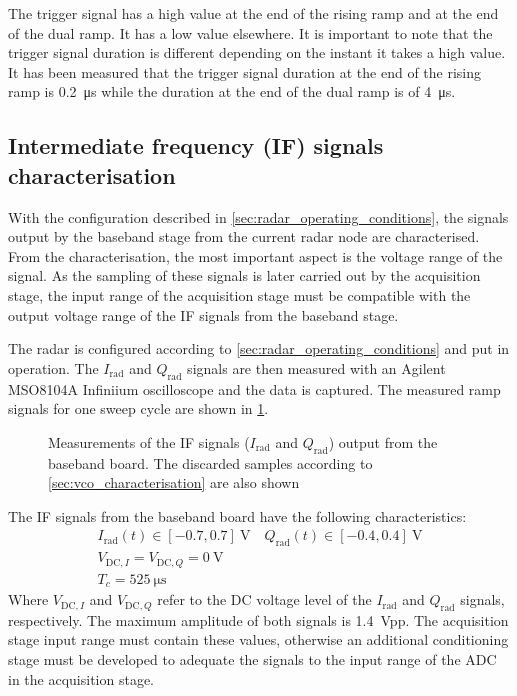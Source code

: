 The trigger signal has a high value at the end of the rising ramp and at the end of the dual ramp. It has a low value elsewhere. It is important to note that the trigger signal duration is different depending on the instant it takes a high value. It has been measured that the trigger signal duration at the end of the rising ramp is \SI{0.2}{\micro\second} while the duration at the end of the dual ramp is of \SI{4}{\micro\second}.

\subsection{Intermediate frequency (IF) signals characterisation} \label{sec:if_signals_characterisation}

With the configuration described in \cref{sec:radar_operating_conditions}, the signals output by the baseband stage from the current radar node are characterised. From the characterisation, the most important aspect is the voltage range of the signal. As the sampling of these signals is later carried out by the acquisition stage, the input range of the acquisition stage must be compatible with the output voltage range of the IF signals from the baseband stage.

The radar is configured according to \cref{sec:radar_operating_conditions} and put in operation. The $I_\mathrm{rad}$ and $Q_\mathrm{rad}$ signals are then measured with an Agilent MSO8104A Infiniium oscilloscope and the data is captured. The measured ramp signals for one sweep cycle are shown in \cref{fig:if_raw}.

\begin{figure}[htb]
	\centering
	\caption{Measurements of the IF signals ($I_\mathrm{rad}$ and $Q_\mathrm{rad}$) output from the baseband board. The discarded samples according to \cref{sec:vco_characterisation} are also shown \label{fig:if_raw}}
\end{figure}

The IF signals from the baseband board have the following characteristics:
\begin{gather} \label{eqn:iq_volts}
	I_\mathrm{rad}(t) \in [-0.7, 0.7]\ \si{\volt}\quad
	Q_\mathrm{rad}(t) \in [-0.4, 0.4]\ \si{\volt} \\
	V_{\mathrm{DC},I} = V_{\mathrm{DC},Q} = \SI{0}{\volt} \\
	T_c = \SI{525}{\micro\second}
\end{gather}
Where $V_{\mathrm{DC},I}$ and $V_{\mathrm{DC},Q}$ refer to the DC voltage level of the $I_\mathrm{rad}$ and $Q_\mathrm{rad}$ signals, respectively. The maximum amplitude of both signals is \SI{1.4}{Vpp}. The acquisition stage input range must contain these values, otherwise an additional conditioning stage must be developed to adequate the signals to the input range of the ADC in the acquisition stage. 

